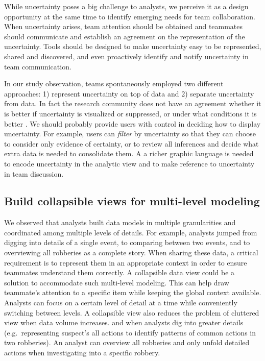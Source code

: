 While uncertainty poses a big challenge to analysts, we  perceive it as a design opportunity at the same time to identify emerging needs for team collaboration. When uncertainty arises, team attention should be obtained and teammates should communicate and establish an agreement on the representation of the uncertainty. Tools should be designed to make uncertainty easy to be represented, shared and discovered, and even proactively identify and notify uncertainty in team communication. 

In our study observation, teams spontaneously employed two different approaches: 
1) represent uncertainty on top of data and 2) separate uncertainty from data. In fact the research community does not have an agreement whether it is better if uncertainty is visualized or suppressed, or under what conditions it is better \citep{Maceachren2005}. We should probably provide users with control in deciding how to display uncertainty. For example, users can \emph{filter} by uncertainty so that they can
choose to consider only evidence of certainty, or to review all
inferences and decide what extra data is needed to consolidate them. A a richer graphic language is needed to encode uncertainty in the analytic view \citep{Bertin1983} and to make reference to uncertainty in team discussion. 

\subsection{Build collapsible views for multi-level modeling}

We observed that analysts built data models in multiple granularities and coordinated among multiple levels of details. For example, analysts jumped from digging into details of a single event, to comparing between two
events, and to overviewing all robberies as a complete story. When sharing these data, a critical requirement is to represent them in an appropriate context in order to ensure teammates understand them correctly. A collapsible data view could be a solution to accommodate such
multi-level modeling. This can help draw teammate's attention to a specific item
while keeping the global context available. Analysts can focus on a certain
level of detail at a time while conveniently switching between levels. A
collapsible view also reduces the problem of cluttered view when data volume
increases.  and when analysts dig into greater
details (e.g.~representing suspect's all actions to identify patterns of common
actions in two robberies). An analyst can overview all robberies and only unfold
detailed actions when investigating into a specific robbery.


